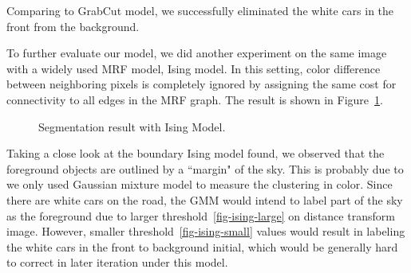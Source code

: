 \documentclass{article} %
\begin{document}
Comparing to GrabCut model, we successfully eliminated the white cars in the front from the background.

To further evaluate our model, we did another experiment on the same image with a widely used MRF model, Ising model. In this setting, color difference between neighboring pixels is completely ignored by assigning the same cost for connectivity to all edges in the MRF graph. The result is shown in Figure~\ref{fig-ising-00_00}.

\begin{figure}[h]
\begin{center}
\end{center}
\caption{Segmentation result with Ising Model.}
\label{fig-ising-00_00}
\end{figure}

Taking a close look at the boundary Ising model found, we observed that the foreground objects are outlined by a ``margin" of the sky. This is probably due to we only used Gaussian mixture model to measure the clustering in color. Since there are white cars on the road, the GMM would intend to label part of the sky as the foreground due to larger threshold~\ref{fig-ising-large} on distance transform image. However, smaller threshold~\ref{fig-ising-small} values would result in labeling the white cars in the front to background initial, which would be generally hard to correct in later iteration under this model.
\end{document}
